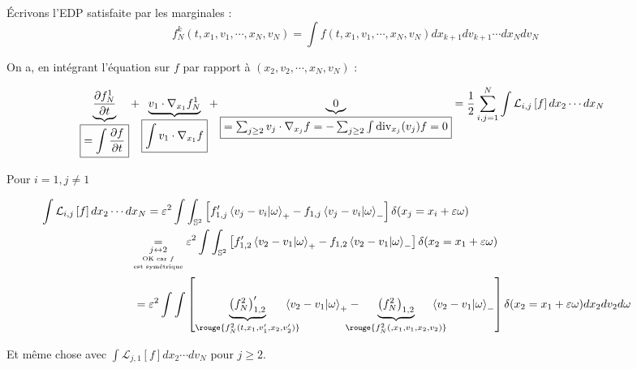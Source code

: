 \documentclass[12pt,a4paper]{article}
\begin{document}
	\begin{dem}
		Écrivons l'EDP satisfaite par les marginales :
		\[
		f_N^k(t,x_1,v_1,\cdots,x_N,v_N) = \displaystyle\int f(t,x_1,v_1,\cdots,x_N,v_N)dx_{k+1}dv_{k+1}\cdots dx_Ndv_N
		\]
		
		\begin{minipage}[t]{18.5cm}
			On a, en intégrant l'équation sur $f$ par rapport à $(x_2,v_2,\cdots,x_N,v_N)$ :
		
		\[
		\hspace{-.8cm}\underbrace{\dfrac{\partial f_N^1}{\partial t}}_{\fbox{$=\displaystyle\int\dfrac{\partial f}{\partial t}$}} + \underbrace{v_1\cdot\nabla_{x_1}f_N^1}_{\fbox{$\displaystyle\int v_1\cdot\nabla_{x_1}f$}} + \underbrace{0}_{\fbox{$=\sum_{j\geq 2} v_j\cdot\nabla_{x_j}f= -\sum_{j\geq 2}\int\text{div}_{x_j}(v_j)f = 0$}} = \dfrac{1}{2} \sum_{i,j=1}^N\int \mathcal{L}_{i,j}\left[f\right]dx_2\cdots dx_N
		\]
		
		Pour $i=1,j\not=1$
		
		\[
		\hspace{-1.2cm}\begin{aligned}
			\displaystyle\int\mathcal L_{i,j}\left[f\right]dx_2\cdots dx_N 
			&= \varepsilon^2\int\int_{\mathbb{S}^2} \left[f_{1,j}'\left<v_j-v_i|\omega\right>_+-f_{1,j}\left<v_j-v_i|\omega\right>_-\right]\delta(x_j=x_i+\varepsilon\omega)\\
			&\hspace{-.5cm}\underset{\underset{\underset{\text{est symétrique}}{\text{OK car $f$}}}{j \leftrightarrow 2}}{=} \varepsilon^2\int\int_{\mathbb{S}^2}\left[f_{1,2}'\left<v_2-v_1|\omega\right>_+-f_{1,2}\left<v_2-v_1|\omega\right>_-\right]\delta(x_2=x_1+\varepsilon\omega)\\
			&\hspace{-.4cm}=\varepsilon^2\int\int \left[\underbrace{\left(f_N^2\right)_{1,2}'}_{\rouge{f_N^2(t,x_1,v_1',x_2,v_2')}}\hspace{-.5cm}\left<v_2-v_1|\omega\right>_+-\hspace{-.5cm}\underbrace{\left(f_N^2\right)_{1,2}}_{\rouge{f_N^2(,x_1,v_1,x_2,v_2)}}\hspace{-.5cm}\left<v_2-v_1|\omega\right>_-\right]\delta(x_2=x_1+\varepsilon\omega)dx_2 dv_2d\omega
		\end{aligned}
		\]
		
		Et même chose avec $\displaystyle\int \mathcal L_{j,1} [f] dx_2\cdots dv_N$ pour $j \geq 2$.\\
		
		\end{minipage}
		

\end{dem}
\end{document}
